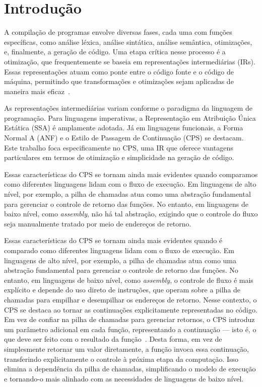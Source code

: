 \chapter{Introdução}\label{sec:introducao}

A compilação de programas envolve diversas fases, cada uma com funções específicas, como análise léxica, análise sintática, análise semântica, otimizações, e, finalmente, a geração de código.
Uma etapa crítica nesse processo é a otimização, que frequentemente se baseia em representações intermediárias (IRs).
Essas representações atuam como ponte entre o código fonte e o código de máquina, permitindo que transformações e otimizações sejam aplicadas de maneira mais eficaz~\cite{plotkin1975call}.

As representações intermediárias variam conforme o paradigma da linguagem de programação.
Para linguagens imperativas, a Representação em Atribuição Única Estática (SSA) é amplamente adotada.
Já em linguagens funcionais, a Forma Normal A (ANF) e o Estilo de Passagem de Continuação (CPS) se destacam.
Este trabalho foca especificamente no CPS, uma IR que oferece vantagens particulares em termos de otimização e simplicidade na geração de código.

Essas características do CPS se tornam ainda mais evidentes quando comparamos como diferentes linguagens lidam com o fluxo de execução. Em linguagens de alto nível, por exemplo, a pilha de chamadas atua como uma abstração fundamental para gerenciar o controle de retorno das funções. No entanto, em linguagens de baixo nível, como \textit{assembly}, não há tal abstração, exigindo que o controle do fluxo seja manualmente tratado por meio de endereços de retorno.

Essas características do CPS se tornam ainda mais evidentes quando é comparado como diferentes linguagens lidam com o fluxo de execução.
Em linguagens de alto nível, por exemplo, a pilha de chamadas atua como uma abstração fundamental para gerenciar o controle de retorno das funções.
No entanto, em linguagens de baixo nível, como \textit{assembly}, o controle de fluxo é mais explícito e depende do uso direto de instruções, que operam sobre a pilha de chamadas para empilhar e desempilhar os endereços de retorno.
Nesse contexto, o CPS se destaca ao tornar as continuações explicitamente representadas no código.
Em vez de confiar na pilha de chamadas para gerenciar retornos, o CPS introduz um parâmetro adicional em cada função, representando a continuação — isto é, o que deve ser feito com o resultado da função~\cite{kennedy2007continuations}.
Desta forma, em vez de simplesmente retornar um valor diretamente, a função invoca essa continuação, transferindo explicitamente o controle à próxima etapa da computação.
Isso elimina a dependência da pilha de chamadas, simplificando o modelo de execução e tornando-o mais alinhado com as necessidades de linguagens de baixo nível.

